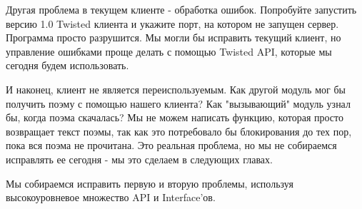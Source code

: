 Другая проблема в текущем клиенте - обработка ошибок. Попробуйте 
запустить версию 1.0 Twisted клиента и укажите порт, на котором 
не запущен сервер. Программа просто разрушится. Мы могли бы 
исправить текущий клиент, но управление ошибками проще делать 
с помощью Twisted API, которые мы сегодня будем использовать. 


И наконец, клиент не является переиспользуемым. Как другой 
модуль мог бы получить поэму с помощью нашего клиента? Как  
"вызывающий" модуль узнал бы, когда поэма скачалась? Мы не можем 
написать функцию, которая просто возвращает текст поэмы, так как 
это потребовало бы блокирования до тех пор, пока вся поэма не 
прочитана. Это реальная проблема, но мы не собираемся исправлять 
ее сегодня - мы это сделаем в следующих главах.



Мы собираемся исправить первую и вторую проблемы, используя 
высокоуровневое множество API и Interface'ов.


